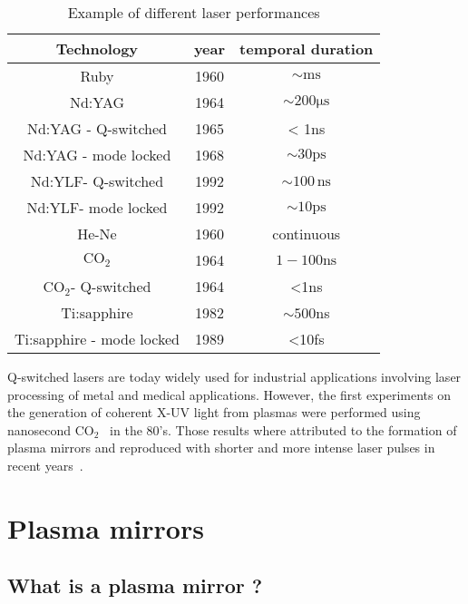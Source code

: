 \begin{table}[H]
\begin{center}
\begin{tabular}{ccc}\toprule
Technology & year & temporal duration \\
\hline
Ruby & 1960 & $\sim \mathrm{ms}$ \\
Nd:YAG & 1964 & $\sim200 \mathrm{\mu s}$ \\
Nd:YAG - Q-switched & 1965 & < 1ns\\
Nd:YAG - mode locked& 1968& $\sim30 \mathrm{ps}$ \\
Nd:YLF- Q-switched & 1992& $\sim100\,\mathrm{ns}$ \\
Nd:YLF- mode locked & 1992& $\sim10 \mathrm{ps}$ \\
He-Ne & 1960 & continuous \\
$\mathrm{CO}_2$ & 1964 & $1-100 \mathrm{ns}$ \\
$\mathrm{CO}_2 $- Q-switched & 1964 & <1ns \\
Ti:sapphire & 1982& $\sim 500$ns \\
Ti:sapphire - mode locked& 1989& <10fs \\
\hline
\end{tabular}
\caption{\label{tab:laserPerfs} Example of different laser performances}
\end{center}
\end{table}



\noindent Q-switched lasers are today widely used for industrial applications involving laser processing of metal and medical applications. However, the first experiments on the generation of coherent X-UV light from plasmas were performed using nanosecond $\mathrm{CO}_2$~\cite{burnett1977harmonic,Carman1981} in the 80's. Those results where attributed to the formation of plasma mirrors and reproduced with shorter and more intense  laser pulses in recent years~\cite{Tarasevitch2000,monot2004high,TheseCedric,borot2011high}.


\section{Plasma mirrors}

\subsection{What is a plasma mirror ?}

